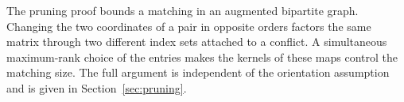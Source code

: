 The pruning proof bounds a matching in an augmented bipartite graph.
Changing the two coordinates of a pair in opposite orders factors the
same matrix through two different index sets attached to a conflict.
A simultaneous maximum-rank choice of the entries makes the kernels of
these maps control the matching size.  The full argument is independent
of the orientation assumption and is given in Section~\ref{sec:pruning}.
